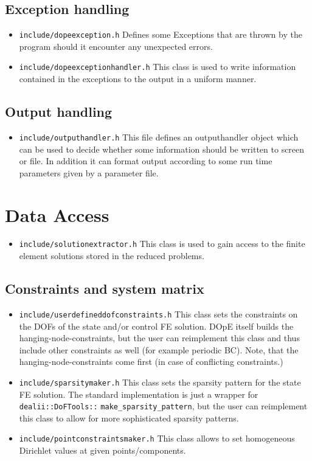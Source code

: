 \subsection{Exception handling}
\begin{itemize}
\item \texttt{include/dopeexception.h} Defines some Exceptions that are thrown by the program
  should it encounter any unexpected errors.
\item \texttt{include/dopeexceptionhandler.h} This class is used to write information 
  contained in the exceptions to the output in a uniform manner.
\end{itemize}

\subsection{Output handling}
\begin{itemize}
\item \texttt{include/outputhandler.h} This file defines an outputhandler object which 
  can be used to decide whether some information should be written to screen or file.
  In addition it can format output according to some run time parameters given by a 
  parameter file.
\end{itemize}

\section{Data Access}
\begin{itemize}
\item \texttt{include/solutionextractor.h} This class is used to gain access to the finite element 
  solutions stored in the reduced problems.
\end{itemize}

\subsection{Constraints and system matrix}
\begin{itemize}
\item \texttt{include/userdefineddofconstraints.h} This class sets the constraints on the DOFs of the state and/or control FE solution. DOpE itself builds the hanging-node-constraints, but the user can reimplement this class and thus include other constraints as well (for example periodic BC). Note, that the hanging-node-constraints come first (in case of conflicting constraints.)
\item \texttt{include/sparsitymaker.h} This class sets the sparsity pattern for the state FE solution. The standard implementation is just a wrapper for \texttt{dealii::DoFTools::} \texttt{make\_sparsity\_pattern}, but the user can reimplement this class to allow for more sophisticated sparsity patterns.
\item \texttt{include/pointconstraintsmaker.h} This class allows to set 
  homogeneous Dirichlet values at given points/components.
\end{itemize}

